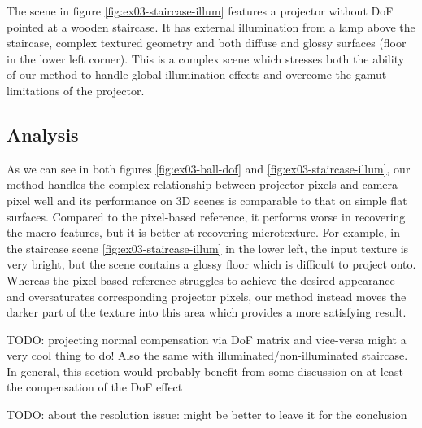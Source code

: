 The scene in figure \ref{fig:ex03-staircase-illum} features a projector without DoF pointed at a wooden staircase. It has external illumination from a lamp above the staircase, complex textured geometry and both diffuse and glossy surfaces (floor in the lower left corner). This is a complex scene which stresses both the ability of our method to handle global illumination effects and overcome the gamut limitations of the projector.

\subsection{Analysis}
\label{section:results-experiments-03-analysis}

As we can see in both figures \ref{fig:ex03-ball-dof} and \ref{fig:ex03-staircase-illum}, our method handles the complex relationship between projector pixels and camera pixel well and its performance on 3D scenes is comparable to that on simple flat surfaces. Compared to the pixel-based reference, it performs worse in recovering the macro features, but it is better at recovering microtexture. For example, in the staircase scene \ref{fig:ex03-staircase-illum} in the lower left, the input texture is very bright, but the scene contains a glossy floor which is difficult to project onto. Whereas the pixel-based reference struggles to achieve the desired appearance and oversaturates corresponding projector pixels, our method instead moves the darker part of the texture into this area which provides a more satisfying result.

{\color{red} TODO: projecting normal compensation via DoF matrix and vice-versa might a very cool thing to do! Also the same with illuminated/non-illuminated staircase. In general, this section would probably benefit from some discussion on at least the compensation of the DoF effect}

{\color{red} TODO: about the resolution issue: might be better to leave it for the conclusion}